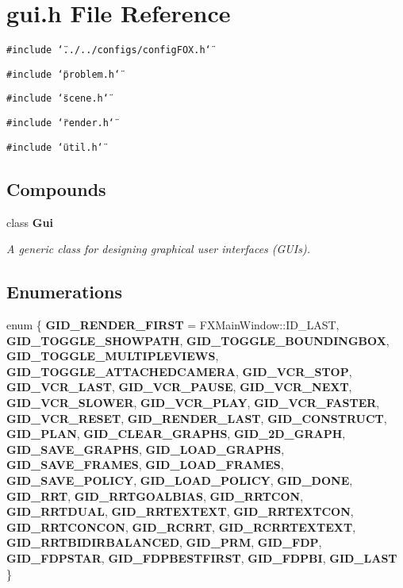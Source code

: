 \section{gui.h File Reference}
\label{gui_8h}
{\tt \#include \char`\"{}../../configs/config\-FOX.h\char`\"{}}\par
{\tt \#include \char`\"{}problem.h\char`\"{}}\par
{\tt \#include \char`\"{}scene.h\char`\"{}}\par
{\tt \#include \char`\"{}render.h\char`\"{}}\par
{\tt \#include \char`\"{}util.h\char`\"{}}\par
\subsection*{Compounds}
\begin{CompactItemize}
\item 
class {\bf Gui}
\begin{CompactList}\small\item\em A generic class for designing graphical user interfaces (GUIs).\item\end{CompactList}\end{CompactItemize}
\subsection*{Enumerations}
\begin{CompactItemize}
\item 
enum \{ {\bf GID\_\-RENDER\_\-FIRST} =  FXMain\-Window::ID\_\-LAST, 
{\bf GID\_\-TOGGLE\_\-SHOWPATH}, 
{\bf GID\_\-TOGGLE\_\-BOUNDINGBOX}, 
{\bf GID\_\-TOGGLE\_\-MULTIPLEVIEWS}, 
{\bf GID\_\-TOGGLE\_\-ATTACHEDCAMERA}, 
{\bf GID\_\-VCR\_\-STOP}, 
{\bf GID\_\-VCR\_\-LAST}, 
{\bf GID\_\-VCR\_\-PAUSE}, 
{\bf GID\_\-VCR\_\-NEXT}, 
{\bf GID\_\-VCR\_\-SLOWER}, 
{\bf GID\_\-VCR\_\-PLAY}, 
{\bf GID\_\-VCR\_\-FASTER}, 
{\bf GID\_\-VCR\_\-RESET}, 
{\bf GID\_\-RENDER\_\-LAST}, 
{\bf GID\_\-CONSTRUCT}, 
{\bf GID\_\-PLAN}, 
{\bf GID\_\-CLEAR\_\-GRAPHS}, 
{\bf GID\_\-2D\_\-GRAPH}, 
{\bf GID\_\-SAVE\_\-GRAPHS}, 
{\bf GID\_\-LOAD\_\-GRAPHS}, 
{\bf GID\_\-SAVE\_\-FRAMES}, 
{\bf GID\_\-LOAD\_\-FRAMES}, 
{\bf GID\_\-SAVE\_\-POLICY}, 
{\bf GID\_\-LOAD\_\-POLICY}, 
{\bf GID\_\-DONE}, 
{\bf GID\_\-RRT}, 
{\bf GID\_\-RRTGOALBIAS}, 
{\bf GID\_\-RRTCON}, 
{\bf GID\_\-RRTDUAL}, 
{\bf GID\_\-RRTEXTEXT}, 
{\bf GID\_\-RRTEXTCON}, 
{\bf GID\_\-RRTCONCON}, 
{\bf GID\_\-RCRRT}, 
{\bf GID\_\-RCRRTEXTEXT}, 
{\bf GID\_\-RRTBIDIRBALANCED}, 
{\bf GID\_\-PRM}, 
{\bf GID\_\-FDP}, 
{\bf GID\_\-FDPSTAR}, 
{\bf GID\_\-FDPBESTFIRST}, 
{\bf GID\_\-FDPBI}, 
{\bf GID\_\-LAST}
 \}
\end{CompactItemize}


